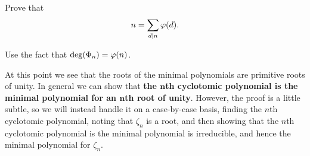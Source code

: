 \documentclass{ximera}
\begin{document}
\begin{exercise}
  Prove that 
  \[
  n = \sum_{d|n} \eulerphi(d).
  \]
  \begin{hint}
    Use the fact that $\deg(\Phi_n) = \eulerphi(n)$.
  \end{hint}
\end{exercise}


At this point we see that the roots of the minimal polynomials are
primitive roots of unity. In general we can show that \textbf{the
  $\boldsymbol{n}$th cyclotomic polynomial is the minimal polynomial
  for an $\boldsymbol{n}$th root of unity}. However, the proof is a
little subtle, so we will instead handle it on a case-by-case basis,
finding the $n$th cyclotomic polynomial, noting that $\zeta_n$ is a
root, and then showing that the $n$th cyclotomic polynomial is the
minimal polynomial is irreducible, and hence the minimal polynomial
for $\zeta_n$.








  
\end{document}
